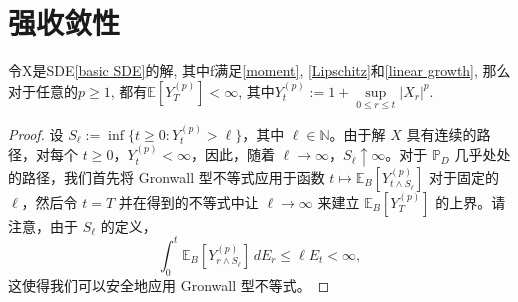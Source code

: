 \section{强收敛性}
\begin{proposition}\label{main pro}
	令X是SDE\cref{basic SDE}的解, 其中f满足\cref{moment}, \cref{Lipschitz}和\cref{linear growth}, 那么对于任意的$p \ge 1$, 都有$\mathbb{E}[Y_T^{(p)}] < \infty$, 其中$Y_t^{(p)} := 1 + \sup\limits_{0\le r\le t}|X_r|^p$.
\end{proposition}
\begin{proof}
	设 $S_{\ell} := \inf\{ t \geq 0 : Y_{t}^{(p)} > \ell \}$，其中 $\ell \in \mathbb{N}$。由于解 $X$ 具有连续的路径，对每个 $t \geq 0$，$Y_{t}^{(p)} < \infty$，因此，随着 $\ell \to \infty$，$S_{\ell} \uparrow \infty$。对于 $\mathbb{P}_D$ 几乎处处的路径，我们首先将 Gronwall 型不等式应用于函数 $t \mapsto \mathbb{E}_B[Y_{t \wedge S_{\ell}}^{(p)}]$ 对于固定的 $\ell$，然后令 $t = T$ 并在得到的不等式中让 $\ell \to \infty$ 来建立 $\mathbb{E}_B[Y_T^{(p)}]$ 的上界。请注意，由于 $S_{\ell}$ 的定义，
	\[
	\int_{0}^{t} \mathbb{E}_B[Y_{r \wedge S_{\ell}}^{(p)}] \, dE_r \leq \ell E_t < \infty,
	\]
	这使得我们可以安全地应用 Gronwall 型不等式。
	

\end{proof}
